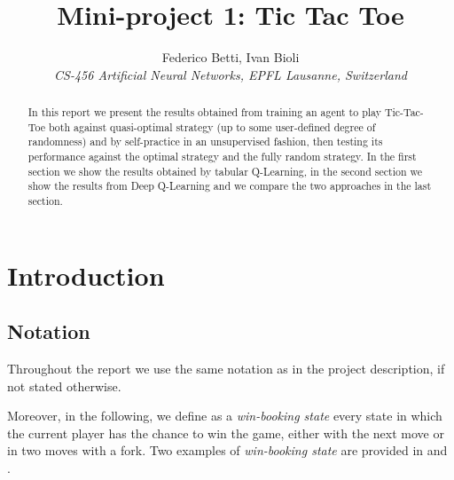 \documentclass[10pt]{IEEEtran}
\begin{document}
\title{Mini-project 1: Tic Tac Toe}

\author{
   Federico Betti, Ivan Bioli\\
  \textit{CS-456 Artificial Neural Networks, EPFL Lausanne, Switzerland}
}


\maketitle

\begin{abstract}
In this report we present the results obtained from training an agent to play Tic-Tac-Toe both against quasi-optimal strategy (up to some user-defined degree of randomness) and by self-practice in an unsupervised fashion, then testing its performance against the optimal strategy and the fully random strategy. In the first section we show the results obtained by tabular Q-Learning, in the second section we show the results from Deep Q-Learning and we compare the two approaches in the last section.
\end{abstract}

\section{Introduction}
\subsection{Notation}
Throughout the report we use the same notation as in the project description, if not stated otherwise.

Moreover, in the following, we define as a \emph{win-booking state} every state in which the current player has the chance to win the game, either with the next move or in two moves with a fork. Two examples of \emph{win-booking state} are provided in  and .
\end{document}
